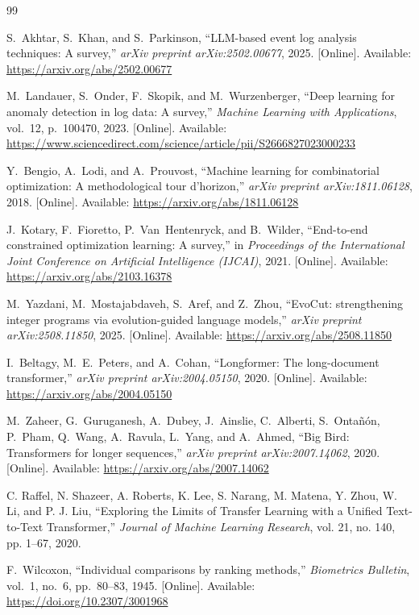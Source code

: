 \documentclass[11pt]{article}
\begin{document}
\begin{thebibliography}{99}

    S.~Akhtar, S.~Khan, and S.~Parkinson, ``LLM-based event log analysis techniques: A survey,''
    \emph{arXiv preprint arXiv:2502.00677}, 2025.
    [Online]. Available: \url{https://arxiv.org/abs/2502.00677}

    M.~Landauer, S.~Onder, F.~Skopik, and M.~Wurzenberger, ``Deep learning for anomaly detection in log data: A survey,''
    \emph{Machine Learning with Applications}, vol.~12, p.~100470, 2023.
    [Online]. Available: \url{https://www.sciencedirect.com/science/article/pii/S2666827023000233}

    Y.~Bengio, A.~Lodi, and A.~Prouvost, ``Machine learning for combinatorial optimization: A methodological tour d'horizon,''
    \emph{arXiv preprint arXiv:1811.06128}, 2018.
    [Online]. Available: \url{https://arxiv.org/abs/1811.06128}

    J.~Kotary, F.~Fioretto, P.~Van~Hentenryck, and B.~Wilder, ``End-to-end constrained optimization learning: A survey,''
    in \emph{Proceedings of the International Joint Conference on Artificial Intelligence (IJCAI)}, 2021.
    [Online]. Available: \url{https://arxiv.org/abs/2103.16378}

    M.~Yazdani, M.~Mostajabdaveh, S.~Aref, and Z.~Zhou, ``EvoCut: strengthening integer programs via evolution-guided language models,''
    \emph{arXiv preprint arXiv:2508.11850}, 2025.
    [Online]. Available: \url{https://arxiv.org/abs/2508.11850}

    I.~Beltagy, M.~E.~Peters, and A.~Cohan, ``Longformer: The long-document transformer,''
    \emph{arXiv preprint arXiv:2004.05150}, 2020.
    [Online]. Available: \url{https://arxiv.org/abs/2004.05150}
    
    M.~Zaheer, G.~Guruganesh, A.~Dubey, J.~Ainslie, C.~Alberti, S.~Ontañón, P.~Pham, Q.~Wang, A.~Ravula, L.~Yang, and A.~Ahmed, ``Big Bird: Transformers for longer sequences,''
    \emph{arXiv preprint arXiv:2007.14062}, 2020.
    [Online]. Available: \url{https://arxiv.org/abs/2007.14062}

    C. Raffel, N. Shazeer, A. Roberts, K. Lee, S. Narang, M. Matena, Y. Zhou, W. Li, and P. J. Liu,
    ``Exploring the Limits of Transfer Learning with a Unified Text-to-Text Transformer,''
    \textit{Journal of Machine Learning Research}, vol. 21, no. 140, pp. 1--67, 2020.

    F.~Wilcoxon, ``Individual comparisons by ranking methods,''
    \emph{Biometrics Bulletin}, vol.~1, no.~6, pp.~80--83, 1945.
    [Online]. Available: \url{https://doi.org/10.2307/3001968}
\end{thebibliography}
\end{document}
